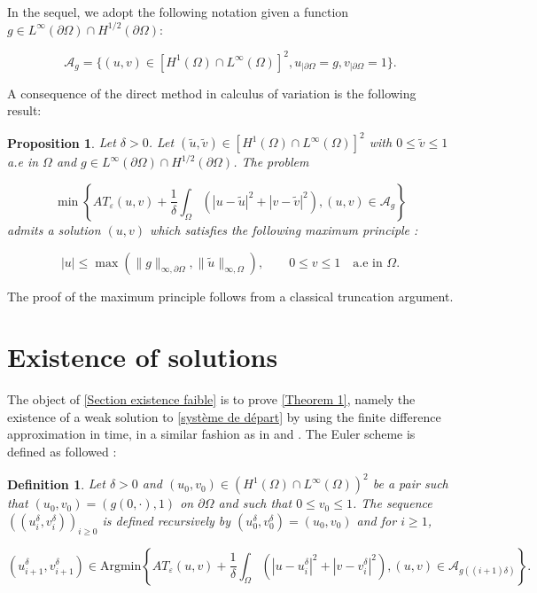 \documentclass[reqno,12pt,twoside]{amsart}
\newtheorem{proposition}{Proposition}[section]
\newtheorem{definition}{Definition}[section]
\numberwithin{equation}{section} \numberwithin{theorem}{section}
\numberwithin{proposition}{section} \numberwithin{lemma}{section}
\numberwithin{corollary}{section}
\numberwithin{definition}{section} \numberwithin{remark}{section}
\begin{document}
\smallskip

In the sequel, we adopt the following notation given a function $g \in L^\infty(\partial \Omega)\cap H^{1/2}(\partial\Omega)$: 

\[\mathcal{A}_g = \{ (u,v) \in [H^1(\Omega) \cap L^\infty (\Omega)]^2, u_{|\partial\Omega} = g, v_{|\partial\Omega} =1\}.\]

A consequence of the direct method in calculus of variation is the following result:  

\begin{proposition}\label{prop : méthode directe}
Let $\delta >0$.
Let $(\tilde{u}, \tilde{v}) \in [H^1(\Omega)\cap L^\infty(\Omega)]^2$ with $0\leqslant \tilde{v} \leqslant 1$ a.e in $\Omega$ and $g \in L^\infty(\partial \Omega)\cap H^{1/2}(\partial\Omega)$. The problem 

\[\min\left\{AT_\varepsilon (u,v) + \frac{1}{\delta} \int_\Omega \left(|u-\tilde{u}|^2 +|v-\tilde{v}|^2\right), (u,v) \in \mathcal{A}_g\right\}\]
admits a solution $(u,v)$ which satisfies the following maximum principle : 

\[ |u| \leqslant \max(\|g\|_{\infty, \partial\Omega}, \|\tilde{u}\|_{\infty,\Omega}), \quad \quad 0\leqslant v\leqslant 1 \quad \text{a.e in }\Omega.\]
\end{proposition}

The proof of the maximum principle follows from a classical truncation argument. 


\section{Existence of solutions}
\label{Section existence faible}

The object of \autoref{Section existence faible} is to prove \autoref{Theorem 1}, namely the existence of a weak solution to \eqref{système de départ} by using the finite difference approximation in time, in a similar fashion as in \cite{X94} and \cite{BM14}. The Euler scheme is defined as followed :

\begin{definition}\label{Eueler Scheme}
Let $\delta >0$ and $(u_0, v_0)\in (H^1(\Omega) \cap L^\infty(\Omega))^2$ be a pair such that $(u_0, v_0)= (g(0,\cdot ), 1)$ on $\partial\Omega$ and such that $0\leqslant v_0 \leqslant 1$. The sequence $((u_i^\delta, v_i^\delta))_{i\geqslant 0}$ is defined recursively by $(u_0^\delta, v_0^\delta) = (u_0, v_0)$ and for $i\geqslant 1$,

\[(u_{i+1}^\delta, v_{i+1}^\delta) \in \text{Argmin} \left\{AT_\varepsilon (u,v) + \frac{1}{\delta} \int_\Omega \left(|u-u_i^\delta|^2 +|v-v_i^\delta|^2\right), (u,v) \in \mathcal{A}_{g((i+1)\delta)}\right\}.\] 
\end{definition}
\end{document}
